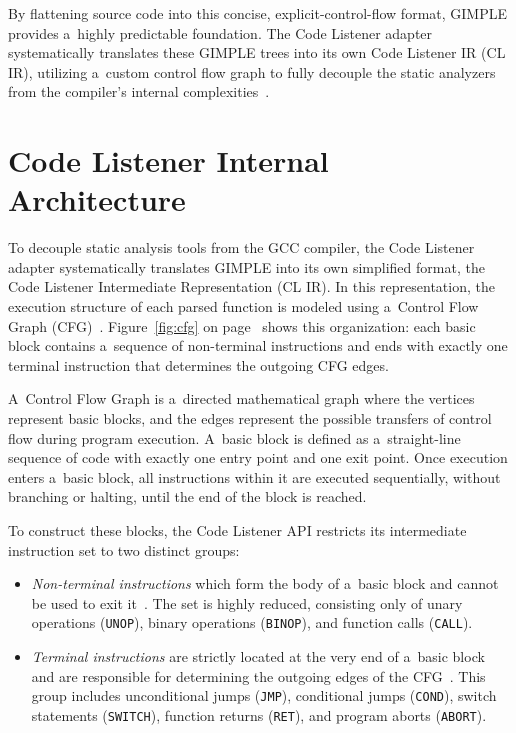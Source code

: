 \documentclass[xpsejal00-gcc-plugin.tex]{subfiles}
\begin{document}
By flattening source code into this concise, explicit-control-flow format, GIMPLE provides a~highly predictable foundation.
The Code Listener adapter systematically translates these GIMPLE trees into its own Code Listener IR (CL IR), utilizing a~custom control flow graph to fully decouple the static analyzers from the compiler's internal complexities~\cite{CodeListener2012}.

\section{Code Listener Internal Architecture}\label{sec:cl-architecture}

To decouple static analysis tools from the GCC compiler, the Code Listener adapter systematically translates GIMPLE into its own simplified format, the Code Listener Intermediate Representation (CL IR).
In this representation, the execution structure of each parsed function is modeled using a~Control Flow Graph (CFG)~\cite{CodeListener2012}.
Figure~\ref{fig:cfg} on page~\pageref{fig:cfg} shows this organization: each basic block contains a~sequence of non-terminal instructions and ends with exactly one terminal instruction that determines the outgoing CFG edges.

A~Control Flow Graph is a~directed mathematical graph where the vertices represent basic blocks, and the edges represent the possible transfers of control flow during program execution.
A~basic block is defined as a~straight-line sequence of code with exactly one entry point and one exit point.
Once execution enters a~basic block, all instructions within it are executed sequentially, without branching or halting, until the end of the block is reached.

To construct these blocks, the Code Listener API restricts its intermediate instruction set to two distinct groups:

\begin{itemize}
  \item \textit{Non-terminal instructions} which form the body of a~basic block and cannot be used to exit it~\cite{CodeListener2012}.
    The set is highly reduced, consisting only of unary operations (\texttt{UNOP}), binary operations (\texttt{BINOP}), and function calls (\texttt{CALL}).
  \item \textit{Terminal instructions} are strictly located at the very end of a~basic block and are responsible for determining the outgoing edges of the CFG~\cite{CodeListener2012}.
    This group includes unconditional jumps (\texttt{JMP}), conditional jumps (\texttt{COND}), switch statements (\texttt{SWITCH}), function returns (\texttt{RET}), and program aborts (\texttt{ABORT}).
\end{itemize}
\end{document}
